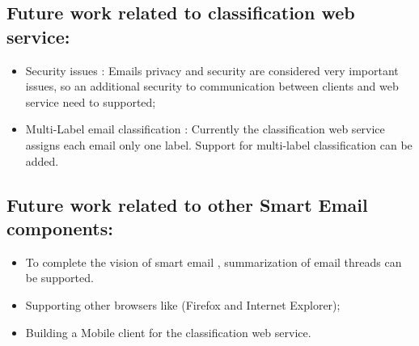 \subsection{Future work related to classification web service:}
\begin{itemize}
    \item Security issues : Emails privacy and security are considered very
    important issues, so an additional security to communication between clients and
    web service need to supported;
    \item Multi-Label email classification : Currently the classification web
    service assigns each email only one label. Support for multi-label
    classification can be added.
\end{itemize}

\subsection{Future work related to other Smart Email components:}
\begin{itemize}
    \item To complete the vision of smart email ,
        summarization of email threads can be supported.
    \item Supporting other browsers like (Firefox and Internet Explorer);
    \item Building a Mobile client for the classification web service.
\end{itemize}



